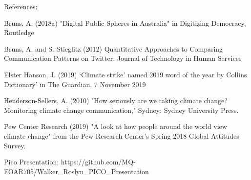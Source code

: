 \documentclass[unknownkeysallowed,usepdftitle=false, parskip=full]{beamer}
\newcommand{\secvariable}{nothing}
\newcommand{\mysection}[1]{\renewcommand{\secvariable}{#1}
}
\begin{document}
\mysection{conclusion}
\begin{frame}\label{\secvariable}
  

References:

\vspace{12pt}
\item Bruns, A. (2018a) "Digital Public Spheres in Australia"  in  Digitizing Democracy, Routledge
\item 
  
 Bruns, A. and S. Stieglitz (2012) Quantitative Approaches to Comparing Communication Patterns on Twitter, Journal of Technology in Human Services %
\item 
Elster Hanson, J. (2019) ‘Climate strike’ named 2019 word of the year by Collins Dictionary' in The Guardian, 7 November 2019
\item 

Henderson-Sellers, A. (2010) "How seriously are we taking climate change? Monitoring climate change communication," Sydney: Sydney University Press.

\item 

Pew Center Research (2019) "A look at how people around the world view climate change" from the  Pew Research Center’s Spring 2018 Global Attitudes Survey.

\item 
Pico Presentation: https://github.com/MQ-FOAR705/Walker_Roslyn_PICO_Presentation


\end{frame}
\end{document}

